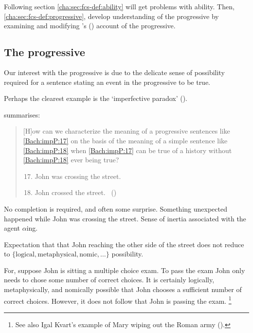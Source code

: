 \begin{note}
  Following section \autoref{cha:sec:fcs-def:ability} will get problems with ability.
  Then, \autoref{cha:sec:fcs-def:progressive}, develop understanding of the progressive by examining and modifying \citeauthor{Landman:1992wh}'s (\citeyear{Landman:1992wh}) account of the progressive.
\end{note}

\subsection{The progressive}

\begin{note}
  Our interest with the progressive is due to the delicate sense of possibility required for a sentence stating an event in the progressive to be true.

  Perhaps the clearest example is the `imperfective paradox' (\citeyear[cf.][Ch.3.1]{Dowty:1979vq}).

  \citeauthor{Bach:1986tb} summarises:
  \begin{quote}
    [H]ow can we characterize the meaning of a progressive sentences like \ref{Bach:impP:17} on the basis of the meaning of a simple sentence like \ref{Bach:impP:18} when \ref{Bach:impP:17} can be true of a history without \ref{Bach:impP:18} ever being true?
    \begin{enumerate}[label=(\arabic*), ref=(\arabic*)]
      \setcounter{enumi}{16}
    \item
      \label{Bach:impP:17}
      John was crossing the street.
    \item
      \label{Bach:impP:18}
      John crossed the street.%
      \mbox{ }\hfill\mbox{(\citeyear[12]{Bach:1986tb})}
    \end{enumerate}
  \end{quote}

  No completion is required, and often some surprise.
  Something unexpected happened while John was crossing the street.
  Sense of inertia associated with the agent \(\alpha\)ing.

  Expectation that that John reaching the other side of the street does not reduce to \(\{\text{logical}, \text{metaphysical}, \text{nomic}, \dots\}\) possibility.

  For, suppose John is sitting a multiple choice exam.
  To pass the exam John only needs to chose some number of correct choices.
  It is certainly logically, metaphysically, and nomically possible that John chooses a sufficient number of correct choices.
  However, it does not follow that John is passing the exam.%
  \footnote{
    See also Igal Kvart's example of Mary wiping out the Roman army (\cite[18]{Landman:1992wh}).
  }


\end{note}
